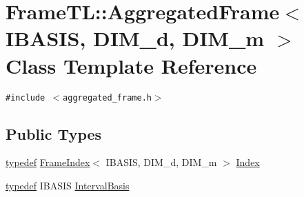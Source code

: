 \hypertarget{classFrameTL_1_1AggregatedFrame}{
\section{FrameTL::AggregatedFrame$<$ IBASIS, DIM\_\-d, DIM\_\-m $>$ Class Template Reference}
\label{classFrameTL_1_1AggregatedFrame}
}
{\tt \#include $<$aggregated\_\-frame.h$>$}

\subsection*{Public Types}
\begin{CompactItemize}
\item 
\hyperlink{structtypedef}{typedef} \hyperlink{classFrameTL_1_1FrameIndex}{FrameIndex}$<$ IBASIS, DIM\_\-d, DIM\_\-m $>$ \hyperlink{classFrameTL_1_1AggregatedFrame_62f05cb9f21d52568f720cde28eb124b}{Index}
\item 
\hyperlink{structtypedef}{typedef} IBASIS \hyperlink{classFrameTL_1_1AggregatedFrame_989c4119c49eeea3d42689317393e35a}{IntervalBasis}
\end{CompactItemize}

